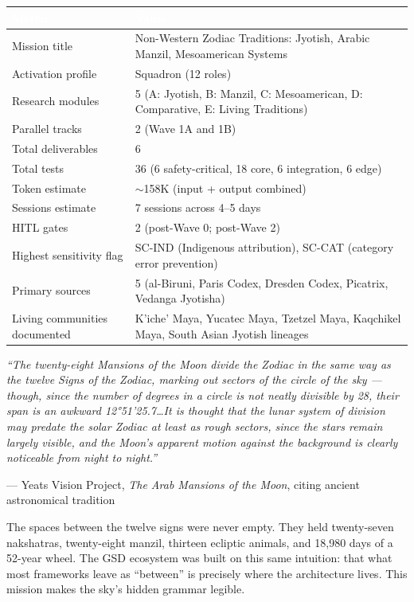 \documentclass[11pt,letterpaper]{article}
\newcommand{\tableheader}[1]{\textbf{\sffamily\textcolor{white}{#1}}}
\begin{document}
\begin{center}
\begin{tabularx}{\textwidth}{L{5cm}X}
\toprule
{}
\tableheader{Metric} & \tableheader{Value} \\
\midrule
Mission title & Non-Western Zodiac Traditions: Jyotish, Arabic Manzil, Mesoamerican Systems \\
Activation profile & Squadron (12 roles) \\
Research modules & 5 (A: Jyotish, B: Manzil, C: Mesoamerican, D: Comparative, E: Living Traditions) \\
Parallel tracks & 2 (Wave 1A and 1B) \\
Total deliverables & 6 \\
Total tests & 36 (6 safety-critical, 18 core, 6 integration, 6 edge) \\
Token estimate & $\sim$158K (input + output combined) \\
Sessions estimate & 7 sessions across 4--5 days \\
HITL gates & 2 (post-Wave 0; post-Wave 2) \\
Highest sensitivity flag & SC-IND (Indigenous attribution), SC-CAT (category error prevention) \\
Primary sources & 5 (al-Biruni, Paris Codex, Dresden Codex, Picatrix, Vedanga Jyotisha) \\
Living communities documented & K'iche' Maya, Yucatec Maya, Tzetzel Maya, Kaqchikel Maya, South Asian Jyotish lineages \\
\bottomrule
\end{tabularx}
\end{center}

\vspace{2em}

\begin{quotebox}
\textit{``The twenty-eight Mansions of the Moon divide the Zodiac in the same way as the twelve Signs of the Zodiac, marking out sectors of the circle of the sky --- though, since the number of degrees in a circle is not neatly divisible by 28, their span is an awkward 12°51'25.7\ldots It is thought that the lunar system of division may predate the solar Zodiac at least as rough sectors, since the stars remain largely visible, and the Moon's apparent motion against the background is clearly noticeable from night to night.''}

\medskip
\hfill --- Yeats Vision Project, \textit{The Arab Mansions of the Moon}, citing ancient astronomical tradition

\medskip
The spaces between the twelve signs were never empty. They held twenty-seven nakshatras, twenty-eight manzil, thirteen ecliptic animals, and 18,980 days of a 52-year wheel. The GSD ecosystem was built on this same intuition: that what most frameworks leave as ``between'' is precisely where the architecture lives. This mission makes the sky's hidden grammar legible.
\end{quotebox}
\end{document}
